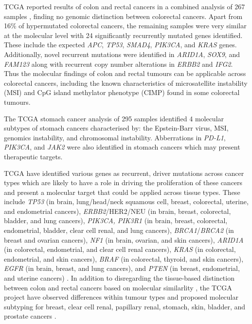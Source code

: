 \gls{TCGA} reported results of colon and rectal cancers in a combined analysis of 267 samples \citep{TCGA2012CRC}, finding no genomic distinction between colorectal cancers. Apart from 16\% of hypermutated colorectal cancers, the remaining samples were very similar at the molecular level with 24 significantly recurrently mutated genes identified. These include the expected \textit{APC}, \textit{TP53}, \textit{SMAD4}, \textit{PIK3CA}, and \textit{KRAS} genes. Additionally, novel recurrent mutations were identified in \textit{ARID1A}, \textit{SOX9}, and  \textit{FAM123} along with recurrent copy number alterations in  \textit{ERBB2} and  \textit{IFG2}. Thus the molecular findings of colon and rectal tumours can be applicable across colorectal cancers, including the known characteristics of microsatellite instability (MSI) and CpG island methylator phenotype (CIMP) found in some colorectal tumours.

The \gls{TCGA} stomach cancer analysis of 295 samples \citep{TCGA2014GC} identified 4 molecular subtypes of stomach cancers characterised by: the Epstein-Barr virus, MSI, \gls{genomics} instability, and chromosomal instability. Abberrations in  \textit{PD-L1}, \textit{PIK3CA}, and \textit{JAK2} were also identified in stomach cancers which may present therapeutic targets.


\gls{TCGA} have identified various genes as recurrent, driver mutations across cancer types which are likely to have a role in driving the proliferation of these cancers and present a molecular target that could be applied across tissue types. These include \textit{TP53} (in brain, lung/head/neck squamous cell, breast, colorectal, uterine, and endometrial cancers), \textit{ERBB2}/HER2/NEU (in brain, breast, colorectal, bladder, and lung cancers), \textit{PIK3CA, PIK3R1} (in brain, breast, colorectal, endometrial, bladder, clear cell renal, and lung cancers), \textit{BRCA1}/\textit{BRCA2} (in breast and ovarian cancers), \textit{NF1} (in brain, ovarian, and skin cancers), \textit{ARID1A} (in colorectal, endometrial, and clear cell renal cancers), \textit{KRAS} (in colorectal, endometrial, and skin cancers), \textit{BRAF} (in colorectal, thyroid, and skin cancers), \textit{EGFR} (in brain, breast, and lung cancers), and \textit{PTEN} (in breast, endometrial, and uterine cancers) \citep{TCGA2008GBM, TCGA2011OV, TCGA2012, TCGA2012LUSC, TCGA2012CRC, TCGA2013RCC, TCGA2013ENDO, TCGA2014BL, TCGA2014LU, TCGA2014TH, TCGA2014GC, TCGA2015LBC, TCGA2015HNSC, TCGA2015SK, TCGA2017CERV, TCGA2017UT}. In addition to disregarding the tissue-based distinction between colon and rectal cancers based on molecular similarlity \citep{TCGA2012CRC}, the \gls{TCGA} project have observed differences within tumour types and proposed molecular subtyping for breast, clear cell renal, papillary renal, stomach, skin, bladder, and prostate cancers \citep{TCGA2012, TCGA2012LUSC, TCGA2012CRC, TCGA2013RCC, TCGA2014BL, TCGA2014GC, TCGA2015LBC, TCGA2015SK, TCGA2016PRC, TCGA2015PR}.

